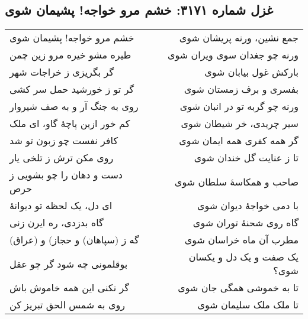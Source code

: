 \begin{center}
\section*{غزل شماره ۳۱۷۱: خشم مرو خواجه! پشیمان شوی}
\label{sec:3171}
\begin{longtable}{l p{0.5cm} r}
خشم مرو خواجه! پشیمان شوی
&&
جمع نشین، ورنه پریشان شوی
\\
طیره مشو خیره مرو زین چمن
&&
ورنه چو جغدان سوی ویران شوی
\\
گر بگریزی ز خراجات شهر
&&
بارکش غول بیابان شوی
\\
گر تو ز خورشید حمل سر کشی
&&
بفسری و برف زمستان شوی
\\
روی به جنگ آر و به صف شیروار
&&
ورنه چو گربه تو در انبان شوی
\\
کم خور ازین پاچهٔ گاو، ای ملک
&&
سیر چریدی، خر شیطان شوی
\\
کافر نفست چو زبون تو شد
&&
گر همه کفری همه ایمان شوی
\\
روی مکن ترش ز تلخی یار
&&
تا ز عنایت گل خندان شوی
\\
دست و دهان را چو بشویی ز حرص
&&
صاحب و همکاسهٔ سلطان شوی
\\
ای دل، یک لحظه تو دیوانهٔ
&&
با دمی خواجهٔ دیوان شوی
\\
گاه بدزدی، ره ایرن زنی
&&
گاه روی شحنهٔ توران شوی
\\
گه ز (سپاهان) و حجاز) و (عراق)
&&
مطرب آن ماه خراسان شوی
\\
بوقلمونی چه شود گر چو عقل
&&
یک صفت و یک دل و یکسان شوی؟
\\
گر نکنی این همه خاموش باش
&&
تا به خموشی همگی جان شوی
\\
روی به شمس الحق تبریز کن
&&
تا ملک ملک سلیمان شوی
\\
\end{longtable}
\end{center}
